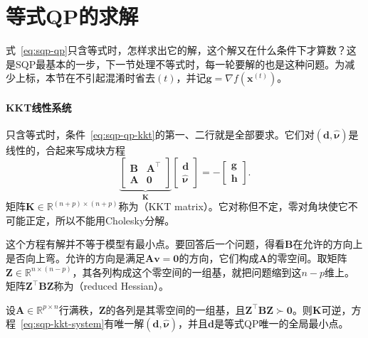 \section{等式QP的求解}
\label{sec:sqp-equality-qp}

式~\eqref{eq:sqp-qp}只含等式时，怎样求出它的解，这个解又在什么条件下才算数？这是SQP最基本的一步，下一节处理不等式时，每一轮要解的也是这种问题。为减少上标，本节在不引起混淆时省去$(t)$，并记$\bm{g}=\nabla f(\bm{x}^{(t)})$。

\paragraph{KKT线性系统}
只含等式时，条件~\eqref{eq:sqp-qp-kkt}的第一、二行就是全部要求。它们对$(\bm{d},\hat{\bm{\nu}})$是线性的，合起来写成块方程
\begin{equation}
 \underbrace{\begin{bmatrix}\bm{B}&\bm{A}^\top\\\bm{A}&\bm{0}\end{bmatrix}}_{\bm{K}}
 \begin{bmatrix}\bm{d}\\\hat{\bm{\nu}}\end{bmatrix}
 =-\begin{bmatrix}\bm{g}\\\bm{h}\end{bmatrix}.
 \label{eq:sqp-kkt-system}
\end{equation}
矩阵$\bm{K}\in\mathbb{R}^{(n+p)\times(n+p)}$称为（KKT matrix）。它对称但不定，零对角块使它不可能正定，所以不能用Cholesky分解。

这个方程有解并不等于模型有最小点。要回答后一个问题，得看$\bm{B}$在允许的方向上是否向上弯。允许的方向是满足$\bm{A}\bm{v}=\bm{0}$的方向，它们构成$\bm{A}$的零空间。取矩阵$\bm{Z}\in\mathbb{R}^{n\times(n-p)}$，其各列构成这个零空间的一组基，就把问题缩到这$n-p$维上。矩阵$\bm{Z}^\top\bm{B}\bm{Z}$称为（reduced Hessian）。

\begin{theorem}[等式QP的可解性]
\label{thm:sqp-eqp}
设$\bm{A}\in\mathbb{R}^{p\times n}$行满秩，$\bm{Z}$的各列是其零空间的一组基，且$\bm{Z}^\top\bm{B}\bm{Z}\succ\bm{0}$。则$\bm{K}$可逆，方程~\eqref{eq:sqp-kkt-system}有唯一解$(\bm{d},\hat{\bm{\nu}})$，并且$\bm{d}$是等式QP唯一的全局最小点。
\end{theorem}


